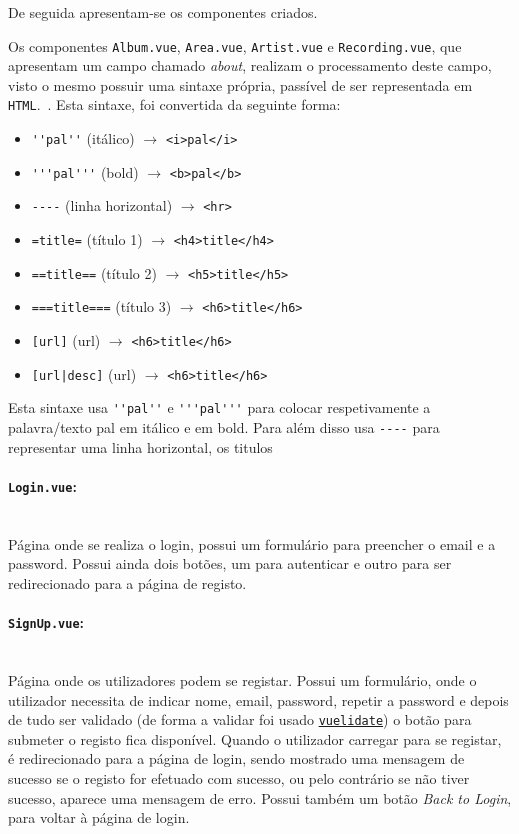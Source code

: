 \documentclass{article}
\begin{document}
\vspace{10px}

De seguida apresentam-se os componentes criados.

Os componentes \texttt{Album.vue}, \texttt{Area.vue}, \texttt{Artist.vue} e \texttt{Recording.vue}, que apresentam um campo chamado \textit{about}, realizam o processamento deste campo, visto o mesmo possuir uma sintaxe própria, passível de ser representada em \texttt{HTML}.~\cite{mbAnnotation}. Esta sintaxe, foi convertida da seguinte forma:
\begin{itemize}
    \item \verb|''pal''| (itálico) $\to$ \verb|<i>pal</i>|
    \item \verb|'''pal'''| (bold) $\to$ \verb|<b>pal</b>|
    \item \verb|----| (linha horizontal) $\to$ \verb|<hr>|
    \item \verb|=title=| (título 1) $\to$ \verb|<h4>title</h4>|
    \item \verb|==title==| (título 2) $\to$ \verb|<h5>title</h5>|
    \item \verb|===title===| (título 3) $\to$ \verb|<h6>title</h6>|
    \item \verb|[url]| (url) $\to$ \verb|<h6>title</h6>|
    \item \texttt{[url|desc]} (url) $\to$ \verb|<h6>title</h6>|
\end{itemize}
Esta sintaxe usa \verb|''pal''| e \verb|'''pal'''| para colocar respetivamente a palavra/texto pal em itálico e em bold. Para além disso usa \verb|----| para representar uma linha horizontal, os titulos 

\paragraph{\texttt{Login.vue}:}\mbox{}\\

Página onde se realiza o login, possui um formulário para preencher o email e a password. Possui ainda dois botões, um para autenticar e outro para ser redirecionado para a página de registo.

\paragraph{\texttt{SignUp.vue}:}\mbox{}\\

Página onde os utilizadores podem se registar. Possui um formulário, onde o utilizador necessita de indicar nome, email, password, repetir a password e depois de tudo ser validado (de forma a validar foi usado \href{https://vuelidate.netlify.com/}{\texttt{vuelidate}}) o botão para submeter o registo fica disponível. Quando o utilizador carregar para se registar, é redirecionado para a página de login, sendo mostrado uma mensagem de sucesso se o registo for efetuado com sucesso, ou pelo contrário se não tiver sucesso, aparece uma mensagem de erro. Possui também um botão \textit{Back to Login}, para voltar à página de login.
\end{document}

